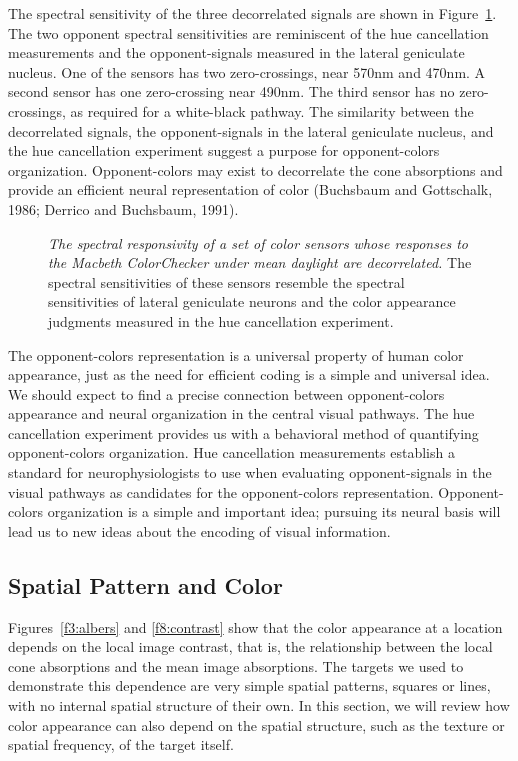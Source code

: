 The spectral sensitivity of the three decorrelated signals are shown
in Figure~\ref{f8:decorSensors}.  The two opponent spectral
sensitivities are reminiscent of the hue cancellation measurements and
the opponent-signals measured in the lateral geniculate nucleus.  One
of the sensors has two zero-crossings, near 570nm and 470nm.  A second
sensor has one zero-crossing near 490nm.  The third sensor has no
zero-crossings, as required for a white-black pathway.  The similarity
between the decorrelated signals, the opponent-signals in the lateral
geniculate nucleus, and the hue cancellation experiment suggest a
purpose for opponent-colors organization.  Opponent-colors may exist
to decorrelate the cone absorptions and provide an efficient neural
representation of color (Buchsbaum and Gottschalk, 1986; Derrico and
Buchsbaum, 1991).
\begin{figure}
\centerline{
}
\caption[Decorrelated Sensors]{
{\em The spectral responsivity of a set of color sensors whose
responses to the Macbeth ColorChecker under mean daylight are
decorrelated.}  The spectral sensitivities of these sensors resemble
the spectral sensitivities of lateral geniculate neurons and the color
appearance judgments measured in the hue cancellation experiment.  }
\label{f8:decorSensors}
\end{figure}

The opponent-colors representation is a universal property of human
color appearance, just as the need for efficient coding is a simple
and universal idea.  We should expect to find a precise connection
between opponent-colors appearance and neural organization in the
central visual pathways.  The hue cancellation experiment provides us
with a behavioral method of quantifying opponent-colors organization.
Hue cancellation measurements establish a standard for
neurophysiologists to use when evaluating opponent-signals in the
visual pathways as candidates for the opponent-colors representation.
Opponent-colors organization is a simple and important idea; pursuing
its neural basis will lead us to new ideas about the encoding of
visual information.

\subsection*{Spatial Pattern and Color}
Figures~\ref{f3:albers} and \ref{f8:contrast} show that the color
appearance at a location depends on the local image contrast, that is,
the relationship between the local cone absorptions and the mean image
absorptions.  The targets we used to demonstrate this dependence are
very simple spatial patterns, squares or lines, with no internal
spatial structure of their own.  In this section, we will review how
color appearance can also depend on the spatial structure, such as the
texture or spatial frequency, of the target itself.

